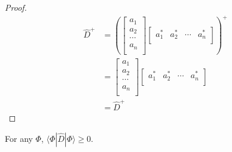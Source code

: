 \begin{proof}
\begin{equation}\label{}
\begin{split}
  \hat{D}^{+} &=
\left(  \begin{bmatrix}
a_{1} \\
a_{2} \\
\cdots   \\
a_{n} \\
\end{bmatrix}
\begin{bmatrix}
a_{1}^{*} & a_{2}^{*} & \cdots & a_{n}^{*} \\
\end{bmatrix} \right)^{+}\\
    &= \begin{bmatrix}
a_{1} \\
a_{2} \\
\cdots   \\
a_{n} \\
\end{bmatrix}
\begin{bmatrix}
a_{1}^{*} & a_{2}^{*} & \cdots & a_{n}^{*} \\
\end{bmatrix} \\
&= \hat{D}^{+}
\end{split}
\end{equation}
\qedhere
\end{proof}

\begin{theorem}\label{}
For any $\Phi$, $\langle\Phi|\hat{D}|\Phi\rangle \geq 0$.
\end{theorem}

